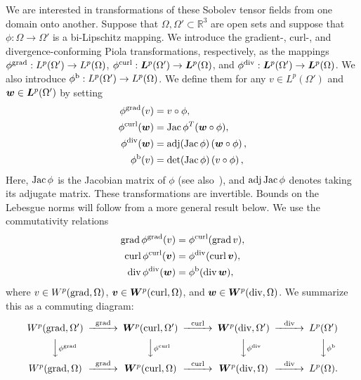 \documentclass[10pt,letterpaper]{article}
\newcommand{\mwl}[1]{{\color{red}#1}}
\begin{document}
We are interested in transformations of these Sobolev tensor fields from one domain onto another. 
Suppose that $\Omega, \Omega' \subset \mathbb{R}^3$ are open sets and suppose that $\phi: \Omega \to \Omega'$ is a bi-Lipschitz mapping.
\mwl{We introduce the} gradient-, curl-, and divergence-conforming Piola transformations, respectively, as the mappings 
$\phi^{\operatorname{grad}}: L^{p}(\Omega') \to L^{p}(\Omega)$,
$\phi^{\operatorname{curl}}: \bm{L}^{p}(\Omega') \to \bm{L}^{p}(\Omega)$, and 
$\phi^{\operatorname{div}}: \bm{L}^{p}(\Omega') \to \bm{L}^{p}(\Omega)$.
We also introduce 
$\phi^{\rm b}: L^{p}(\Omega') \to L^{p}(\Omega)$. 
We define them 
for any $v \in L^{p}(\Omega')$ and $\bm{w} \in \bm{L}^{p}(\Omega')$ by setting 
\begin{subequations}\label{eq_definition_piola}
\begin{align*}
    \phi^{\operatorname{grad}}(v) &= v \circ \phi, \\
    \phi^{\operatorname{curl}}(\bm{w}) &= \operatorname{{\rm Jac}}\phi^{T} (\bm{w} \circ \phi), \\
    \phi^{\operatorname{div}}(\bm{w}) &= \operatorname{adj}(\operatorname{{\rm Jac}}\phi) \left( \bm{w} \circ \phi \right), \\  
    \phi^{\rm b}(v) &= \det(\operatorname{{\rm Jac}}\phi) \left( v \circ \phi \right),
\end{align*}
\end{subequations}
Here, $\operatorname{{\rm Jac}}\phi$ is the Jacobian matrix of $\phi$ (see also~\cite[Definition~9.8]{ern2021finite}), and $\operatorname{adj}\operatorname{{\rm Jac}}\phi$ denotes taking its adjugate matrix.
These transformations are invertible. 
Bounds on the Lebesgue norms will follow from a more general result below. 
We use the commutativity relations 
\begin{subequations}\label{eq_piola_commute}
\begin{align}
    \operatorname{grad} \phi^{\operatorname{grad}} (v) &= \phi^{\operatorname{curl}}(\operatorname{grad} v), 
    \\
    \operatorname{curl} \phi^{\operatorname{curl}}(\bm{v}) &= \phi^{\operatorname{div}}(\operatorname{curl} \bm{v}), 
    \\
    \operatorname{div} \phi^{\operatorname{div}}(\bm{w}) &= \phi^{\rm b}(\operatorname{div} \bm{w}),
\end{align}
\end{subequations}
where $v \in W^{p}(\operatorname{grad},\Omega)$, $\bm{v} \in \bm{W}^{p}(\operatorname{curl},\Omega)$, and $\bm{w} \in \bm{W}^{p}(\operatorname{div},\Omega)$.  
We summarize this as a commuting diagram:
\begin{align*}
    \begin{CD}
        W^{p}(\grad,\Omega') @>{\grad}>> \bfW^{p}(\curl,\Omega') @>{\curl}>> \bfW^{p}(\divergence,\Omega') @>{\divergence}>> L^{p}(\Omega')
        \\
        @VV{\phi^{\grad}}V 
        @VV{\phi^{\curl}}V 
        @VV{\phi^{\divergence}}V 
        @VV{\phi^{\rm b}}V 
        \\
        W^{p}(\grad,\Omega ) @>{\grad}>> \bfW^{p}(\curl,\Omega ) @>{\curl}>> \bfW^{p}(\divergence,\Omega ) @>{\divergence}>> L^{p}(\Omega ).
    \end{CD}
\end{align*}
\end{document}
